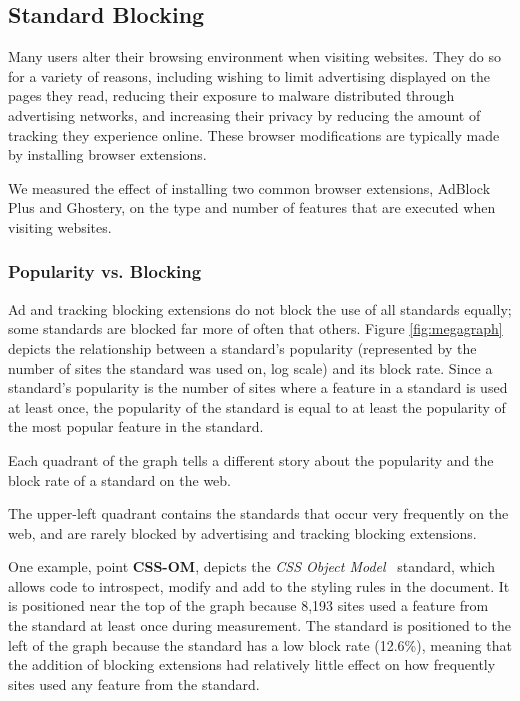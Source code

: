 \subsection{Standard Blocking}
\label{sec:results-feature-blocking}
Many users alter their browsing environment when visiting websites.  They do so
for a variety of reasons, including wishing to limit advertising displayed
on the pages they read, reducing their exposure to malware distributed through
advertising networks, and increasing their privacy by reducing the amount
of tracking they experience online.  These browser modifications are typically
made by installing browser extensions.

We measured the effect of installing two common browser
extensions, AdBlock Plus and Ghostery, on the type and number of
features that are executed when visiting websites.

\subsubsection{Popularity vs. Blocking}
\label{sec:results-feature-popularity}



Ad and tracking blocking extensions do not block the use of all standards
equally; some standards are blocked far more of often that others.
Figure \ref{fig:megagraph} depicts the relationship between a standard's popularity (represented by
the number of sites the standard was used on, log scale) and
its block rate.  Since a standard's popularity is the number of sites where
a feature in a standard is used at least once, the popularity of the standard
is equal to at least the popularity of the most popular feature in the standard.

Each quadrant of the graph tells a different story about the popularity and
the block rate of a standard on the web.

The upper-left quadrant contains the standards that occur very frequently on the
web, and are rarely blocked by advertising and tracking blocking extensions.

One example, point \textbf{CSS-OM}, depicts the
\textit{CSS Object Model}~\cite{cssomw3c} standard, which allows \JS code
to introspect, modify and add to the styling rules in the document.  It is
positioned near the top of the graph because 8,193 sites used a feature
from the standard at least once during measurement.  The standard is positioned
to the left of the graph because the standard has a low block rate (12.6\%),
meaning that the addition of blocking extensions had relatively little effect
on how frequently sites used any feature from the standard.

